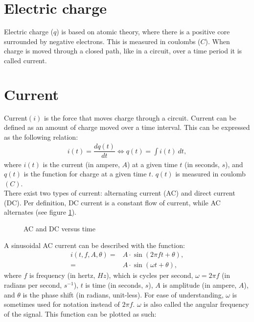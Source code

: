 \section{Electric charge}
Electric charge ($q$) is based on atomic theory, where there is a positive core surrounded by negative electrons. This is measured in coulombs ($C$). When charge is moved through a closed path, like in a circuit, over a time period it is called current.   
\section{Current}
Current$(i)$ is the force that moves charge through a circuit. Current can be defined as an amount of charge moved over a time interval. This can be expressed as the following relation: \cite[p.~3]{bcircuit5}
\begin{align}
i(t)=\dfrac{dq(t)}{dt} \Leftrightarrow q(t)=\int i(t)\ dt,\label{I=dq/dt}
\end{align}
where $i(t)$ is the current (in ampere, $A$) at a given time $t$ (in seconds, $s$), and $q(t)$ is the function for charge at a given time $t$. $q(t)$ is measured in coulomb $(C)$.
\\
There exist two types of current: alternating current (AC) and direct current (DC). Per definition, DC current is a constant flow of current, while AC alternates (see figure \ref{fig:ACDC}). 
\begin{figure}[H] 

\caption{AC and DC versus time}
\label{fig:ACDC}
\end{figure}
\noindent
A sinusoidal AC current can be described with the function: 
\begin{align}
i\left(t, f, A, \theta\right) =& A\cdot \sin{\left(2\pi ft + \theta\right)}, \nonumber
\\
=& A \cdot \sin{\left(\omega t + \theta\right)}, \label{eq:omega}
\end{align}
where $f$ is frequency (in hertz, $Hz$), which is cycles per second, $\omega = 2\pi f$ (in radians per second, $s^{-1}$), $t$ is time (in seconds, $s$), $A$ is amplitude (in ampere, $A$), and $\theta$ is the phase shift (in radians, unit-less).
For ease of understanding, $\omega$ is sometimes used for notation instead of $2\pi f$. $\omega$ is also called the angular frequency of the signal.
This function can be plotted as such:
